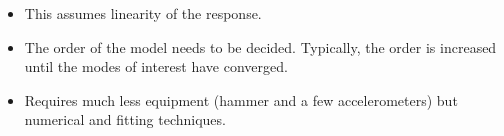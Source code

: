 \documentclass[10pt,a4paper]{scrartcl}
\begin{document}
\begin{multicols*}{2}
\begin{enumerate}


\begin{itemize}
\item This assumes linearity of the response.
\item The order of the model needs to be decided. Typically, the order is increased until the modes of interest have converged.
\item Requires much less equipment (hammer and a few accelerometers) but numerical and fitting techniques.
\end{itemize}
\end{enumerate}

\end{multicols*}
\end{document}
